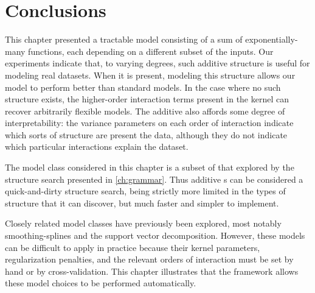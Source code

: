 \section{Conclusions}

This chapter presented a tractable \gp{} model consisting of a sum of exponentially-many functions, each depending on a different subset of the inputs.
Our experiments indicate that, to varying degrees, such additive structure is useful for modeling real datasets.
When it is present, modeling this structure allows our model to perform better than standard \gp{} models.
In the case where no such structure exists, the higher-order interaction terms present in the kernel can recover arbitrarily flexible models.
The additive \gp{} also affords some degree of interpretability: the variance parameters on each order of interaction indicate which sorts of structure are present the data, although they do not indicate which particular interactions explain the dataset.

The model class considered in this chapter is a subset of that explored by the structure search presented in \cref{ch:grammar}.
Thus additive \gp{}s can be considered a quick-and-dirty structure search, being strictly more limited in the types of structure that it can discover, but much faster and simpler to implement.

Closely related model classes have previously been explored, most notably smoothing-splines \ANOVA{} and the support vector \ANOVA{} decomposition.
However, these models can be difficult to apply in practice because their kernel parameters, regularization penalties, and the relevant orders of interaction must be set by hand or by cross-validation.
This chapter illustrates that the \gp{} framework allows these model choices to be performed automatically.


\outbpdocument{


}





